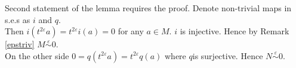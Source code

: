 \begin{pf}
  Second statement of the lemma requires the proof. Denote non-trivial maps in s.e.s as $i$ and $q$.\\

  Then $i(t^{2\varepsilon}a) = t^{2\varepsilon}i(a) = 0$ for any $a \in M$. $i$ is injective. Hence by Remark \ref{epstriv} $M \stackrel{\varepsilon}{\sim} 0$.\\

  On the other side $0 = q(t^{2\varepsilon}a) = t^{2\varepsilon}q(a)$ where $q$is surjective. Hence $N \stackrel{\varepsilon}{\sim} 0$.
\end{pf}
